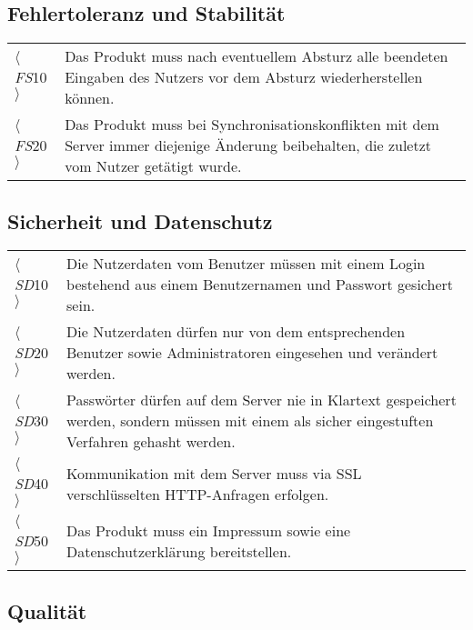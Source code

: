 \subsection{Fehlertoleranz und Stabilität}

\begin{tabular}{p{1cm}p{13cm}}
     $\langle$\textit{FS}10$\rangle$ & Das Produkt muss nach eventuellem Absturz alle beendeten Eingaben des Nutzers vor dem Absturz wiederherstellen können.\\
     $\langle$\textit{FS}20$\rangle$ & Das Produkt muss bei \Gls{Synchronisation}skonflikten mit dem \Gls{Server} immer diejenige Änderung beibehalten, die zuletzt vom Nutzer getätigt wurde.\\
\end{tabular}

\subsection{Sicherheit und Datenschutz}

\begin{tabular}{p{1cm}p{13cm}}
     $\langle$\textit{SD}10$\rangle$ & Die Nutzerdaten vom Benutzer müssen mit einem \Gls{Login} bestehend aus einem Benutzernamen und Passwort gesichert sein.\\
     $\langle$\textit{SD}20$\rangle$ & Die Nutzerdaten dürfen nur von dem entsprechenden Benutzer sowie \Gls{Administrator}en eingesehen und verändert werden.\\
     $\langle$\textit{SD}30$\rangle$ & Passwörter dürfen auf dem \Gls{Server} nie in Klartext gespeichert werden, sondern müssen mit einem als sicher eingestuften Verfahren \gls{gehasht} werden.\\
     $\langle$\textit{SD}40$\rangle$ & Kommunikation mit dem \Gls{Server} muss via \Gls{SSL} verschlüsselten \Gls{HTTP}-Anfragen erfolgen.\\
     $\langle$\textit{SD}50$\rangle$ & Das Produkt muss ein Impressum sowie eine Datenschutzerklärung bereitstellen.\\
\end{tabular}

\subsection{Qualität}

